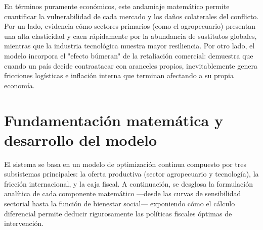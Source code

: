 \documentclass[12pt, a4paper]{article}
\begin{document}
En términos puramente económicos, este andamiaje matemático permite cuantificar la vulnerabilidad de cada mercado y los daños colaterales del conflicto. Por un lado, evidencia cómo sectores primarios (como el agropecuario) presentan una alta elasticidad y caen rápidamente por la abundancia de sustitutos globales, mientras que la industria tecnológica muestra mayor resiliencia. Por otro lado, el modelo incorpora el "efecto búmeran" de la retaliación comercial: demuestra que cuando un país decide contraatacar con aranceles propios, inevitablemente genera fricciones logísticas e inflación interna que terminan afectando a su propia economía.

\section{Fundamentación matemática y desarrollo del modelo}

El sistema se basa en un modelo de optimización continua compuesto por tres subsistemas principales: la oferta productiva (sector agropecuario y tecnología), la fricción internacional, y la caja fiscal. A continuación, se desglosa la formulación analítica de cada componente matemático —desde las curvas de sensibilidad sectorial hasta la función de bienestar social— exponiendo cómo el cálculo diferencial permite deducir rigurosamente las políticas fiscales óptimas de intervención.
\end{document}
